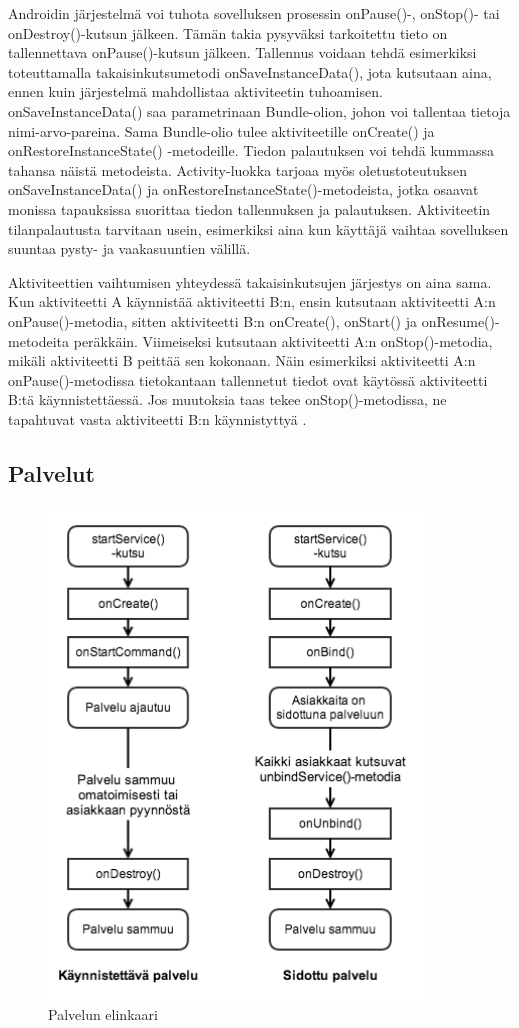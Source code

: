 Androidin järjestelmä voi tuhota sovelluksen prosessin onPause()-, onStop()- tai onDestroy()-kutsun jälkeen. Tämän takia pysyväksi tarkoitettu tieto on tallennettava onPause()-kutsun jälkeen. Tallennus voidaan tehdä esimerkiksi toteuttamalla takaisinkutsumetodi onSaveInstanceData(), jota kutsutaan aina, ennen kuin järjestelmä mahdollistaa aktiviteetin tuhoamisen. onSaveInstanceData() saa parametrinaan Bundle-olion, johon voi tallentaa tietoja nimi-arvo-pareina. Sama Bundle-olio tulee aktiviteetille onCreate() ja onRestoreInstanceState() -metodeille. Tiedon palautuksen voi tehdä kummassa tahansa näistä metodeista. Activity-luokka tarjoaa myös oletustoteutuksen onSaveInstanceData() ja onRestoreInstanceState()-metodeista, jotka osaavat monissa tapauksissa suorittaa tiedon tallennuksen ja palautuksen. Aktiviteetin tilanpalautusta tarvitaan usein, esimerkiksi aina kun käyttäjä vaihtaa sovelluksen suuntaa pysty- ja vaakasuuntien välillä.

Aktiviteettien vaihtumisen yhteydessä takaisinkutsujen järjestys on aina sama. Kun aktiviteetti A käynnistää aktiviteetti B:n, ensin kutsutaan aktiviteetti A:n onPause()-metodia, sitten aktiviteetti B:n onCreate(), onStart() ja onResume()-metodeita peräkkäin. Viimeiseksi kutsutaan aktiviteetti A:n onStop()-metodia, mikäli aktiviteetti B peittää sen kokonaan. Näin esimerkiksi aktiviteetti A:n onPause()-metodissa tietokantaan tallennetut tiedot ovat käytössä aktiviteetti B:tä käynnistettäessä. Jos muutoksia taas tekee onStop()-metodissa, ne tapahtuvat vasta aktiviteetti B:n käynnistyttyä \cite{android}.

\subsection{Palvelut}

\begin{figure}[htb]
\includegraphics[width=100mm]{service_lifecycle.png}
\caption{Palvelun elinkaari \protect\cite{android}} \label{service_lifecycle}
\end{figure}

